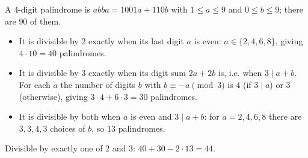 A $4$-digit palindrome is $\overline{abba}=1001a+110b$ with $1\le a\le9$ and $0\le b\le9$; there are $90$ of them.
\begin{itemize}
\item It is divisible by $2$ exactly when its last digit $a$ is even: $a\in\{2,4,6,8\}$, giving $4\cdot10=40$ palindromes.
\item It is divisible by $3$ exactly when its digit sum $2a+2b$ is, i.e. when $3\mid a+b$. For each $a$ the number of digits $b$ with $b\equiv-a\pmod3$ is $4$ (if $3\mid a$) or $3$ (otherwise), giving $3\cdot4+6\cdot3=30$ palindromes.
\item It is divisible by both when $a$ is even and $3\mid a+b$: for $a=2,4,6,8$ there are $3,3,4,3$ choices of $b$, so $13$ palindromes.
\end{itemize}
Divisible by exactly one of $2$ and $3$: $40+30-2\cdot13=\boxed{44}$.

